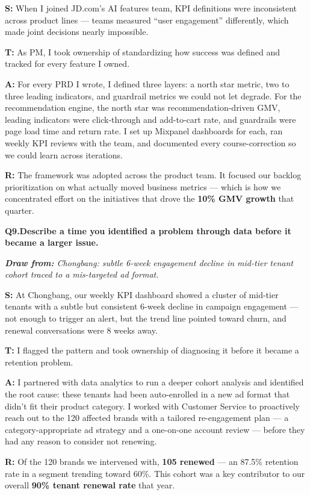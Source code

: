 \documentclass[10pt, letterpaper]{article}
\newcommand{\q}[2]{%
    \smallskip
    \noindent\textbf{\small Q#1.}\quad\textbf{#2}
    \vspace{3pt}
}
\newcommand{\hint}[1]{%
    \begin{notebox}
    \footnotesize\textit{\textbf{Draw from:} #1}
    \end{notebox}
}
\newcommand{\s}[1]{\textbf{\textcolor{starlabel}{S:}} #1}
\newcommand{\ta}[1]{\textbf{\textcolor{starlabel}{T:}} #1}
\newcommand{\ac}[1]{\textbf{\textcolor{starlabel}{A:}} #1}
\newcommand{\res}[1]{\textbf{\textcolor{starlabel}{R:}} #1}
\begin{document}
\begin{answerbox}
\footnotesize
\s{When I joined JD.com's AI features team, KPI definitions were inconsistent across product lines --- teams measured ``user engagement'' differently, which made joint decisions nearly impossible.}

\medskip
\ta{As PM, I took ownership of standardizing how success was defined and tracked for every feature I owned.}

\medskip
\ac{For every PRD I wrote, I defined three layers: a north star metric, two to three leading indicators, and guardrail metrics we could not let degrade. For the recommendation engine, the north star was recommendation-driven GMV, leading indicators were click-through and add-to-cart rate, and guardrails were page load time and return rate. I set up Mixpanel dashboards for each, ran weekly KPI reviews with the team, and documented every course-correction so we could learn across iterations.}

\medskip
\res{The framework was adopted across the product team. It focused our backlog prioritization on what actually moved business metrics --- which is how we concentrated effort on the initiatives that drove the \textbf{10\% GMV growth} that quarter.}
\end{answerbox}

\q{9}{Describe a time you identified a problem through data before it became a larger issue.}
\hint{Chongbang: subtle 6-week engagement decline in mid-tier tenant cohort traced to a mis-targeted ad format.}

\begin{answerbox}
\footnotesize
\s{At Chongbang, our weekly KPI dashboard showed a cluster of mid-tier tenants with a subtle but consistent 6-week decline in campaign engagement --- not enough to trigger an alert, but the trend line pointed toward churn, and renewal conversations were 8 weeks away.}

\medskip
\ta{I flagged the pattern and took ownership of diagnosing it before it became a retention problem.}

\medskip
\ac{I partnered with data analytics to run a deeper cohort analysis and identified the root cause: these tenants had been auto-enrolled in a new ad format that didn't fit their product category. I worked with Customer Service to proactively reach out to the 120 affected brands with a tailored re-engagement plan --- a category-appropriate ad strategy and a one-on-one account review --- before they had any reason to consider not renewing.}

\medskip
\res{Of the 120 brands we intervened with, \textbf{105 renewed} --- an 87.5\% retention rate in a segment trending toward 60\%. This cohort was a key contributor to our overall \textbf{90\% tenant renewal rate} that year.}
\end{answerbox}
\end{document}
